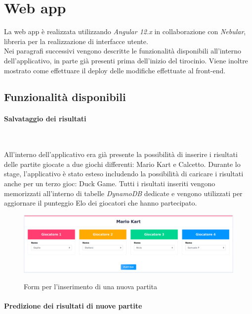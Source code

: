 \section{Web app}
La web app è realizzata utilizzando \emph{Angular 12.x} in collaborazione con \emph{Nebular}, libreria per la realizzazione di interfacce utente. \\
Nei paragrafi successivi vengono descritte le funzionalità disponibili all'interno dell'applicativo, in parte già presenti prima dell'inizio del tirocinio. Viene inoltre mostrato come effettuare il \gls{deploy} delle modifiche effettuate al front-end.
	\subsection{Funzionalità disponibili}
		\paragraph{Salvataggio dei risultati} ~\smallskip 
		
		\noindent All'interno dell'applicativo era già presente la possibilità di inserire i risultati delle partite giocate a due giochi differenti: Mario Kart e Calcetto. Durante lo stage, l'applicativo è stato esteso includendo la possibilità di caricare i risultati anche per un terzo gioc: Duck Game.
		Tutti i risultati inseriti vengono memorizzati all'interno di tabelle \emph{DynamoDB} dedicate e vengono utilizzati per
		aggiornare il punteggio \gls{Elo} dei giocatori che hanno partecipato.
		
		\begin{figure}[H]
			\centering
			\includegraphics[width=\textwidth]{immagini/insPartita.png} \\
			\caption{\label{fig:inserimento} Form per l'inserimento di una nuova partita}
		\end{figure}
		
		\paragraph{Predizione dei risultati di nuove partite} ~\smallskip 
		
